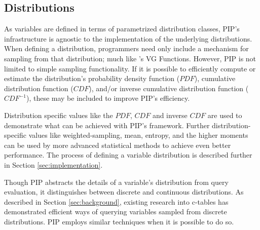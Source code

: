 \subsection{Distributions}
As variables are defined in terms of parametrized distribution classes, PIP's infrastructure is agnostic to the implementation of the underlying distributions.  When defining a distribution, programmers need only include a mechanism for sampling from that distribution; much like \cite{MCDB}'s VG Functions.  However, PIP is not limited to simple sampling functionality.  If it is possible to efficiently compute or estimate the distribution's probability density function ($PDF$), cumulative distribution function ($CDF$), and/or inverse cumulative distribution function ($CDF^{-1}$), these may be included to improve PIP's efficiency.  

Distribution specific values like the $PDF$, $CDF$ and inverse $CDF$ are used to demonstrate what can be achieved with PIP's framework.  Further distribution-specific values like weighted-sampling, mean, entropy, and the higher moments can be used by more advanced statistical methods to achieve even better performance.  The process of defining a variable distribution is described further in Section \ref{sec:implementation}.  

Though PIP abstracts the details of a variable's distribution from query evaluation, it distinguishes between discrete and continuous distributions.  As described in Section \ref{sec:background}, existing research into c-tables has demonstrated efficient ways of querying variables sampled from discrete distributions.  PIP employs similar techniques when it is possible to do so.


